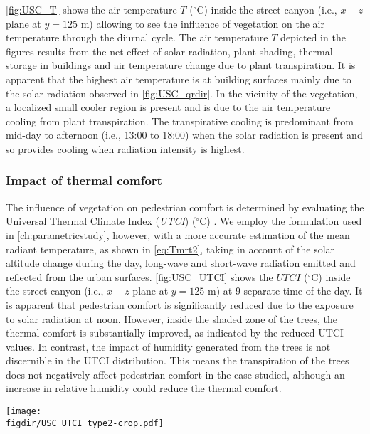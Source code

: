 \cref{fig:USC_T} shows the air temperature $T$ ($^{\circ}$C) inside the street-canyon (i.e., $x-z$ plane at $y=125$ m) allowing to see the influence of vegetation on the air temperature through the diurnal cycle. The air temperature $T$ depicted in the figures results from the net effect of solar radiation, plant shading, thermal storage in buildings and air temperature change due to plant transpiration. It is apparent that the highest air temperature is at building surfaces mainly due to the solar radiation observed in \cref{fig:USC_qrdir}. In the vicinity of the vegetation, a localized small cooler region is present and is due to the air temperature cooling from plant transpiration. The transpirative cooling is predominant from mid-day to afternoon (i.e., 13:00 to 18:00) when the solar radiation is present and so provides cooling when radiation intensity is highest. 

\subsubsection*{Impact of thermal comfort}

The influence of vegetation on pedestrian comfort is determined by evaluating the Universal Thermal Climate Index (\textit{UTCI}) ($^{\circ}$C) \citep{Fiala2001,Manickathan2018a}. We employ the formulation used in \cref{ch:parametricstudy}, however, with a more accurate estimation of the mean radiant temperature, as shown in \cref{eq:Tmrt2}, taking in account of the solar altitude change during the day, long-wave and short-wave radiation emitted and reflected from the urban surfaces. \cref{fig:USC_UTCI} shows the $\textit{UTCI}$ ($^{\circ}$C) inside the street-canyon (i.e., $x-z$ plane at $y=125$ m) at 9 separate time of the day. It is apparent that pedestrian comfort is significantly reduced due to the exposure to solar radiation at noon. However, inside the shaded zone of the trees, the thermal comfort is substantially improved, as indicated by the reduced UTCI values. In contrast, the impact of humidity generated from the trees is not discernible in the UTCI distribution. This means the transpiration of the trees does not negatively affect pedestrian comfort in the case studied, although an increase in relative humidity could reduce the thermal comfort.


\begin{sidewaysfigure}[p]
	\centering
	\texttt{[image: \\figdir/USC\_UTCI\_type2-crop.pdf]}
	\caption{Universal thermal climate index $\textit{UTCI}$ ($^{\circ}$C) inside the street-canyon where the vegetation zone is indicated by a green box. The plot shows the fields with a $150$ minutes interval from $03$:$00$ (HH:MM) to $23$:$00$ (HH:MM).}
	\label{fig:USC_UTCI}
\end{sidewaysfigure}

